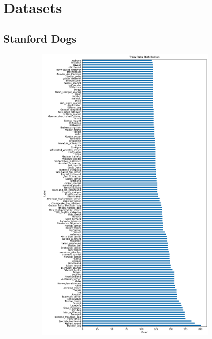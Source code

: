 \section{Datasets}\label{appendix:datasets}

\subsection{Stanford Dogs}\label{appendix:datasets:stanford-dogs}

\begin{figure}[ht]
  \centering
 \begin{subfigure}{.48\textwidth}
    \centering
    \includegraphics[width=\textwidth]{appendixes/images/dogs-train.png}

\end{subfigure}
\end{figure}
